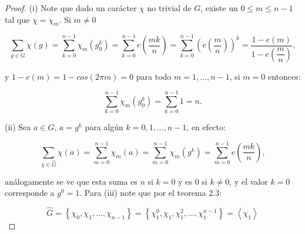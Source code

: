 \begin{proof}
(i) Note que dado un carácter $\chi$ no trivial de $G$, existe un $0\leq m\leq n-1$ tal que $\chi=\chi_m$. Si $m\neq 0$

$$\sum_{g \in G} \chi(g)=\sum_{k=0}^{n-1} \chi_m\left(g_0^k\right)=\sum_{k=0}^{n-1} e\left(\frac{m k}{n}\right)=\sum_{k=0}^{n-1}\left(e\left(\frac{m}{n}\right)\right)^k=\dfrac{1-e(m)}{1-e\left(\dfrac{m}{n}\right)},$$

y $1-e(m)=1-cos(2\pi m)=0$ para todo $m=1,\ldots,n-1$, si $m=0$ entonces:

$$\sum_{k=0}^{n-1} \chi_m\left(g_0^k\right)=\sum_{k=0}^{n-1} 1=n.$$

(ii) Sea $a\in G$, $a=g^{k}$ para algún $k=0,1,\ldots,n-1$, en efecto:

$$\sum_{\chi \in \widehat{G}} \chi(a)=\sum_{m=0}^{n-1} \chi_m(a)=\sum_{m=0}^{n-1} \chi_m\left(g^k\right)=\sum_{m=0}^{n-1} e\left(\frac{m k}{n}\right),$$

análogamente se ve que esta suma es $n$ si $k=0$ y es 0 si $k\neq 0$, y el valor $k=0$ corresponde a $g^{0}=1$. Para (iii) note que por el teorema 2.3:

$$\widehat{G}=\left\{\chi_0, \chi_1, \ldots, \chi_{n-1}\right\}=\left\{\chi_1^0, \chi_1, \chi_1^2, \ldots, \chi_1^{n-1}\right\}=\left\langle\chi_1\right\rangle$$

\end{proof}

$$$$